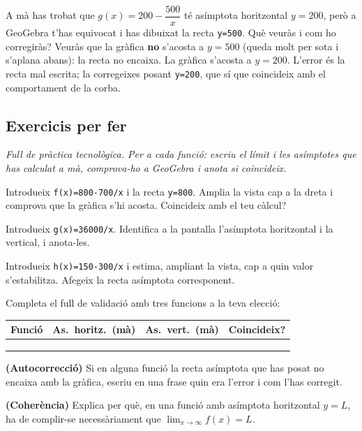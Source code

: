 \begin{exresolt}
A mà has trobat que $g(x)=200-\dfrac{500}{x}$ té asímptota horitzontal $y=200$, però a
GeoGebra t'has equivocat i has dibuixat la recta \texttt{y=500}. Què veuràs i com ho
corregiràs?
\solucio
Veuràs que la gràfica \textbf{no} s'acosta a $y=500$ (queda molt per sota i s'aplana
abans): la recta no encaixa. La gràfica s'acosta a $y=200$. L'error és la recta mal
escrita; la corregeixes posant \texttt{y=200}, que sí que coincideix amb el
comportament de la corba.
\end{exresolt}

\subsection{Exercicis per fer}

\noindent\textit{Full de pràctica tecnològica. Per a cada funció: escriu el límit i les
asímptotes que has calculat a mà, comprova-ho a GeoGebra i anota si coincideix.}

\begin{exercicis}
\begin{exlist}
  \item Introdueix \texttt{f(x)=800-700/x} i la recta \texttt{y=800}. Amplia la vista
        cap a la dreta i comprova que la gràfica s'hi acosta. Coincideix amb el teu
        càlcul?
  \item Introdueix \texttt{g(x)=36000/x}. Identifica a la pantalla l'asímptota
        horitzontal i la vertical, i anota-les.
  \item Introdueix \texttt{h(x)=150-300/x} i estima, ampliant la vista, cap a quin valor
        s'estabilitza. Afegeix la recta asímptota corresponent.
  \item Completa el full de validació amb tres funcions a la teva elecció:
        \begin{center}
        \renewcommand{\arraystretch}{1.4}
        \begin{tabular}{p{3.2cm} p{2.6cm} p{2.6cm} p{2.4cm}}
        \toprule
        \textbf{Funció} & \textbf{As.\ horitz.\ (mà)} & \textbf{As.\ vert.\ (mà)} & \textbf{Coincideix?} \\
        \midrule
         & & & \\[10pt]
         & & & \\[10pt]
         & & & \\
        \bottomrule
        \end{tabular}
        \end{center}
  \item \textbf{(Autocorrecció)} Si en alguna funció la recta asímptota que has posat no
        encaixa amb la gràfica, escriu en una frase quin era l'error i com l'has
        corregit.
  \item \textbf{(Coherència)} Explica per què, en una funció amb asímptota horitzontal
        $y=L$, ha de complir-se necessàriament que $\lim_{x\to\infty}f(x)=L$.
\end{exlist}
\end{exercicis}

